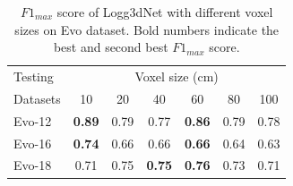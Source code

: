 \begin{table}[htbp]
  \centering
  \begin{tabular}{p{2cm} *{6}{c}}
      \toprule
      \multicolumn{1}{l}{Testing} & \multicolumn{6}{c}{Voxel size (cm)} \\
      \cmidrule{2-7}
      \multicolumn{1}{l}{Datasets} & 10 & 20 & 40 & 60 & 80 & 100 \\
      \midrule
      Evo-12 &\textbf{0.89} &0.79 &0.77 &\textbf{0.86} &0.79 &0.78 \\
      \addlinespace %
      Evo-16 & \textbf{0.74} & 0.66 & 0.66 & \textbf{0.66} & 0.64 & 0.63 \\
      \addlinespace %
      Evo-18  &0.71 & 0.75 & \textbf{0.75} & \textbf{0.76} & 0.73 & 0.71 \\
      \bottomrule
  \end{tabular}

  \caption{$F{1}_{max}$ score of Logg3dNet with different voxel sizes on Evo dataset. Bold numbers indicate the best and second best $F{1}_{max}$ score.}
  \label{tab:voxel_size}
\end{table}

  

